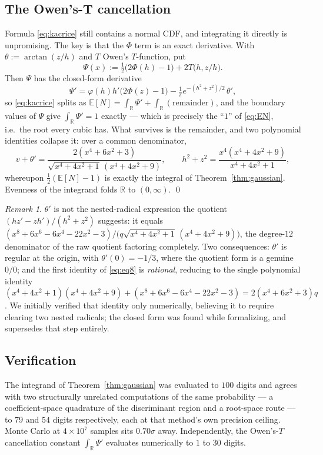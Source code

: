 \documentclass[11pt,reqno]{amsart}
\theoremstyle{plain}
\theoremstyle{remark}
\newtheorem{remark}[theorem]{Remark}
\newcommand{\RR}{\mathbb{R}}
\begin{document}
\subsection{The Owen's-T cancellation}
Formula \eqref{eq:kacrice} still contains a normal CDF, and integrating it
directly is unpromising. The key is that the $\Phi$ term is an exact
derivative. With $\theta:=\arctan(z/h)$ and $T$ Owen's $T$-function, put
\[
  \Psi(x) := \tfrac{1}{2}\bigl(2\Phi(h)-1\bigr) + 2T\bigl(h, z/h\bigr) .
\]
Then $\Psi$ has the closed-form derivative
\[
  \Psi' = \varphi(h)h'\bigl(2\Phi(z)-1\bigr) - \tfrac{1}{\pi}e^{-(h^2+z^2)/2}\,\theta' ,
\]
so \eqref{eq:kacrice} splits as $\mathbb{E}[N]=\int_\RR\Psi' + \int_\RR(\text{remainder})$,
and the boundary values of $\Psi$ give $\int_\RR\Psi'=1$ exactly --- which is
precisely the ``$1$'' of \eqref{eq:EN}, i.e.\ the root every cubic has. What
survives is the remainder, and two polynomial identities collapse it: over a
common denominator,
\begin{equation} \label{eq:eq8}
  v+\theta' = \frac{2(x^4+6x^2+3)}{\sqrt{x^4+4x^2+1}\,(x^4+4x^2+9)},
  \qquad
  h^2+z^2 = \frac{x^4(x^4+4x^2+9)}{x^4+4x^2+1},
\end{equation}
whereupon $\tfrac12(\mathbb{E}[N]-1)$ is exactly the integral of
Theorem~\ref{thm:gaussian}. Evenness of the integrand folds $\RR$ to
$(0,\infty)$. \qed

\begin{remark}
$\theta'$ is not the nested-radical expression the quotient
$(hz'-zh')/(h^2+z^2)$ suggests: it equals
$(x^8+6x^6-6x^4-22x^2-3)/\bigl(q\sqrt{x^4+4x^2+1}\,(x^4+4x^2+9)\bigr)$, the
degree-$12$ denominator of the raw quotient factoring completely. Two
consequences: $\theta'$ is regular at the origin, with $\theta'(0)=-1/3$,
where the quotient form is a genuine $0/0$; and the first identity of
\eqref{eq:eq8} is \emph{rational}, reducing to the single polynomial identity
$(x^4+4x^2+1)(x^4+4x^2+9)+(x^8+6x^6-6x^4-22x^2-3)=2(x^4+6x^2+3)q$. We
initially verified that identity only numerically, believing it to require
clearing two nested radicals; the closed form was found while formalizing,
and supersedes that step entirely.
\end{remark}

\subsection{Verification}
The integrand of Theorem~\ref{thm:gaussian} was evaluated to $100$ digits and
agrees with two structurally unrelated computations of the same probability
--- a coefficient-space quadrature of the discriminant region and a
root-space route --- to $79$ and $54$ digits respectively, each at that
method's own precision ceiling. Monte Carlo at $4\times10^7$ samples sits
$0.70\sigma$ away. Independently, the Owen's-$T$ cancellation constant
$\int_\RR\Psi'$ evaluates numerically to $1$ to $30$ digits.
\end{document}
